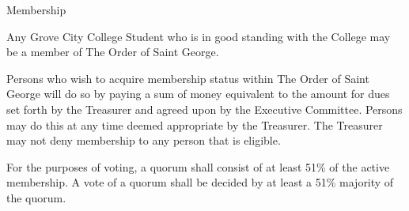 {
\begin{article}{Membership}
	\item Any Grove City College Student who is in good standing with the College may be a member of The Order of Saint George.
	\item Persons who wish to acquire membership status within The Order of Saint George will do so by paying a sum of money equivalent to the amount for dues set forth by the Treasurer and agreed upon by the Executive Committee.  Persons may do this at any time deemed appropriate by the Treasurer.  The Treasurer may not deny membership to any person that is eligible.
	\item For the purposes of voting, a quorum shall consist of at least 51\% of the active membership.  A vote of a quorum shall be decided by at least a 51\% majority of the quorum.
\end{article}
}
